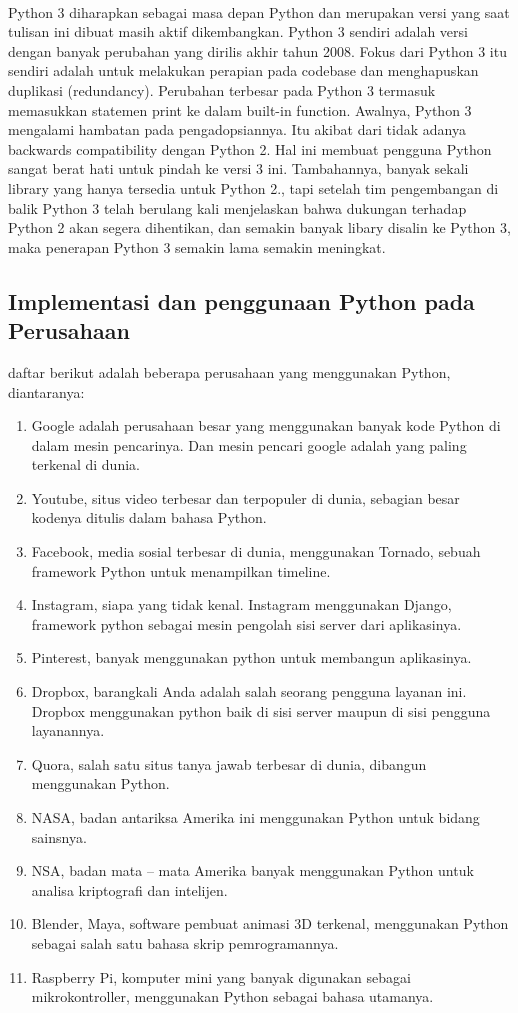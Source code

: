 \paragraph{}
Python 3 diharapkan sebagai masa depan Python dan merupakan versi yang saat tulisan ini dibuat masih aktif dikembangkan. Python 3 sendiri adalah versi dengan banyak perubahan yang dirilis akhir tahun 2008. Fokus dari Python 3 itu sendiri adalah untuk melakukan perapian pada codebase dan menghapuskan duplikasi (redundancy). Perubahan terbesar pada Python 3 termasuk memasukkan statemen print ke dalam built-in function. Awalnya, Python 3 mengalami hambatan pada pengadopsiannya. Itu akibat dari tidak adanya backwards compatibility dengan Python 2. Hal ini membuat pengguna Python sangat berat hati untuk pindah ke versi 3 ini. Tambahannya, banyak sekali library yang hanya tersedia untuk Python 2., tapi setelah tim pengembangan di balik Python 3 telah berulang kali menjelaskan bahwa dukungan terhadap Python 2 akan segera dihentikan, dan semakin banyak libary disalin ke Python 3, maka penerapan Python 3 semakin lama semakin meningkat.
\subsection{Implementasi dan penggunaan Python pada Perusahaan}
daftar berikut adalah beberapa perusahaan yang menggunakan Python, diantaranya:
\begin{enumerate}
\item
Google adalah perusahaan besar yang menggunakan banyak kode Python di dalam mesin pencarinya. Dan mesin pencari google adalah yang paling terkenal di dunia.
\item
Youtube, situs video terbesar dan terpopuler di dunia, sebagian besar kodenya ditulis dalam bahasa Python.
\item
Facebook, media sosial terbesar di dunia, menggunakan Tornado, sebuah framework Python untuk menampilkan timeline.
\item
Instagram, siapa yang tidak kenal. Instagram menggunakan Django, framework python sebagai mesin pengolah sisi server dari aplikasinya.
\item
Pinterest, banyak menggunakan python untuk membangun aplikasinya.
\item
Dropbox, barangkali Anda adalah salah seorang pengguna layanan ini. Dropbox menggunakan python baik di sisi server maupun di sisi pengguna layanannya.
\item
Quora, salah satu situs tanya jawab terbesar di dunia, dibangun menggunakan Python.
\item
NASA, badan antariksa Amerika ini menggunakan Python untuk bidang sainsnya.
\item
NSA, badan mata – mata Amerika banyak menggunakan Python untuk analisa kriptografi dan intelijen.
\item
Blender, Maya, software pembuat animasi 3D terkenal, menggunakan Python sebagai salah satu bahasa skrip pemrogramannya.
\item
Raspberry Pi, komputer mini yang banyak digunakan sebagai mikrokontroller, menggunakan Python sebagai bahasa utamanya.
\end{enumerate}



